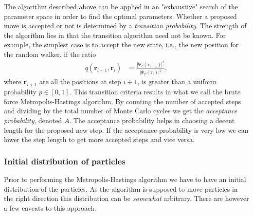 \documentclass[
    a4paper, aps, twocolumn, floatfix, superscriptaddress,
    nofootinbib]{revtex4-1}
\newcommand{\vf}{\mathbf}
\newcommand{\1}{\mathds{1}}
\begin{document}
        The algorithm described above can be applied in an "exhaustive" search
        of the parameter space in order to find the optimal parameters.  Whether
        a proposed move is accepted or not is determined by a \emph{transition
        probability}. The strength of the algorithm lies in that the transition
        algorithm need not be known. For example, the simplest case is to accept
        the new state, i.e., the new position for the random walker, if the
        ratio
        \begin{align}
            q(\vf{r}_{i + 1}, \vf{r}_i)
            &=
            \frac{\left|\Psi_T(\vf{r}_{i + 1})\right|^2}
            {\left|\Psi_T(\vf{r}_{i})\right|^2},
        \end{align}
        where $\vf{r}_{i + 1}$ are all the positions at step $i + 1$, is greater
        than a uniform probability $p \in [0, 1]$. This transition criteria
        results in what we call the brute force Metropolis-Hastings algorithm.
        By counting the number of accepted steps and dividing by the total
        number of Monte Carlo cycles we get the \emph{acceptance probability},
        denoted $A$.  The acceptance probability helps in choosing a decent
        length for the proposed new step. If the acceptance probability is very
        low we can lower the step length to get more accepted steps and vice
        versa.

        \subsubsection{Initial distribution of particles}
            Prior to performing the Metropolis-Hastings algorithm we have to
            have an initial distribution of the particles. As the algorithm is
            supposed to move particles in the right direction this distribution
            can be \emph{somewhat} arbitrary. There are however a few caveats to
            this approach.
\end{document}

